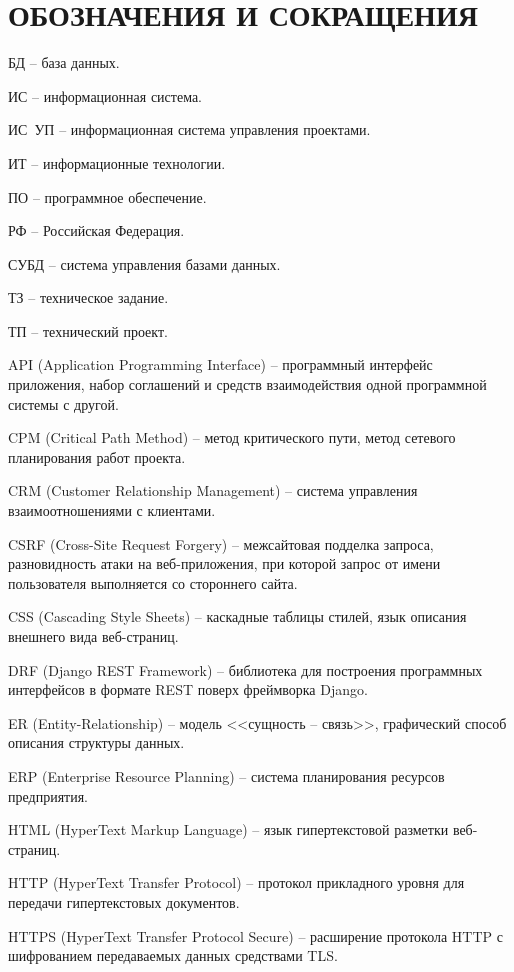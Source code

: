 \section*{ОБОЗНАЧЕНИЯ И СОКРАЩЕНИЯ}

БД -- база данных.

ИС -- информационная система.

ИС~УП -- информационная система управления проектами.

ИТ -- информационные технологии.

ПО -- программное обеспечение.

РФ -- Российская Федерация.

СУБД -- система управления базами данных.

ТЗ -- техническое задание.

ТП -- технический проект.

API (Application Programming Interface) -- программный интерфейс приложения, набор соглашений и средств взаимодействия одной программной системы с другой.

CPM (Critical Path Method) -- метод критического пути, метод сетевого планирования работ проекта.

CRM (Customer Relationship Management) -- система управления взаимоотношениями с клиентами.

CSRF (Cross-Site Request Forgery) -- межсайтовая подделка запроса, разновидность атаки на веб-приложения, при которой запрос от имени пользователя выполняется со стороннего сайта.

CSS (Cascading Style Sheets) -- каскадные таблицы стилей, язык описания внешнего вида веб-страниц.

DRF (Django REST Framework) -- библиотека для построения программных интерфейсов в формате REST поверх фреймворка Django.

ER (Entity-Relationship) -- модель <<сущность -- связь>>, графический способ описания структуры данных.

ERP (Enterprise Resource Planning) -- система планирования ресурсов предприятия.

HTML (HyperText Markup Language) -- язык гипертекстовой разметки веб-страниц.

HTTP (HyperText Transfer Protocol) -- протокол прикладного уровня для передачи гипертекстовых документов.

HTTPS (HyperText Transfer Protocol Secure) -- расширение протокола HTTP с шифрованием передаваемых данных средствами TLS.

